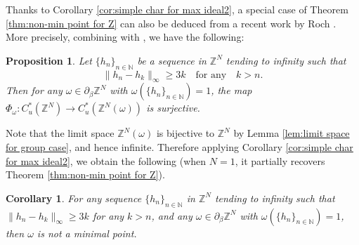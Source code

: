 \documentclass[12pt, a4paper]{amsart}
\numberwithin{equation}{section}
\newtheorem{cor}[thm]{Corollary}
\newtheorem{prop}[thm]{Proposition}
\theoremstyle{definition}
\theoremstyle{remark}
\def\NN{\mathbb{N}}
\def\ZZ{\mathbb{Z}}
\begin{document}
Thanks to Corollary \ref{cor:simple char for max ideal2}, a special case of Theorem \ref{thm:non-min point for Z} can also be deduced from a recent work by Roch \cite{Roc22}. More precisely, combining \cite[Proposition B.6]{SW17} with \cite[Lemma 2.1]{Roc22}, we have the following:

\begin{prop}\label{prop:Roc22}
Let $\{h_n\}_{n\in \NN}$ be a sequence in $\ZZ^N$ tending to infinity such that 
\[
\|h_n - h_k\|_\infty \geq 3k \quad \text{for any} \quad k>n. 
\]
Then for any $\omega \in \partial_\beta \ZZ^N$ with $\omega(\{h_n\}_{n\in \NN}) =1$, the map $\Phi_\omega: C^*_u(\ZZ^N) \longrightarrow C^*_u(\ZZ^N(\omega))$ is surjective.
\end{prop}

Note that the limit space $\ZZ^N(\omega)$ is bijective to $\ZZ^N$ by Lemma \ref{lem:limit space for group case}, and hence infinite. Therefore applying Corollary \ref{cor:simple char for max ideal2}, we obtain the following (when $N=1$, it partially recovers Theorem \ref{thm:non-min point for Z}).

\begin{cor}\label{cor:Thm reproved}
For any sequence $\{h_n\}_{n\in \NN}$ in $\ZZ^N$ tending to infinity such that $\|h_n - h_k\|_\infty \geq 3k$ for any $k>n$, and any $\omega \in \partial_\beta \ZZ^N$ with $\omega(\{h_n\}_{n\in \NN})=1$, then $\omega$ is \emph{not} a minimal point.
\end{cor}
\end{document}
